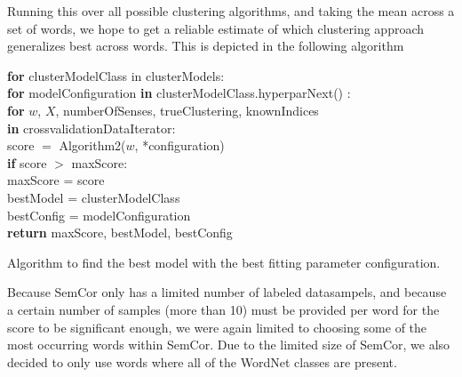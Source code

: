 \documentclass[a4paper,12pt,oneside,openright]{report}
\begin{document}
\hfill \break

Running this over all possible clustering algorithms, and taking the mean across a set of words, we hope to get a reliable estimate of which clustering approach generalizes best across words.
This is depicted in the following algorithm

\begin{algorithm}[H]
\SetAlgoLined
{}

\textbf{for} clusterModelClass in clusterModels:  \\
\quad \quad \textbf{for} modelConfiguration \textbf{in} clusterModelClass.hyperparNext() :  \\
\quad \quad \quad \quad \textbf{for} $w$, $X$, numberOfSenses, trueClustering, knownIndices \\
\quad \quad \quad \quad \textbf{in} crossvalidationDataIterator:  \\

\quad \quad \quad \quad \quad \quad score $=$ Algorithm2($w$, *configuration) \\
\quad \quad \quad \quad \quad \quad \textbf{if} score $>$ maxScore: \\
\quad \quad \quad \quad \quad \quad \quad \quad  maxScore = score \\
\quad \quad \quad \quad \quad \quad \quad \quad  bestModel = clusterModelClass \\
\quad \quad \quad \quad \quad \quad \quad \quad  bestConfig = modelConfiguration \\

\textbf{return} maxScore, bestModel, bestConfig
 
 \caption{Algorithm to find the best model with the best fitting parameter configuration.}
\end{algorithm}

\hfill \break

Because SemCor only has a limited number of labeled datasampels, and because a certain number of samples (more than 10) must be provided per word for the score to be significant enough, we were again limited to choosing some of the most occurring words within SemCor.
Due to the limited size of SemCor, we also decided to only use words where all of the WordNet classes are present.
\end{document}
